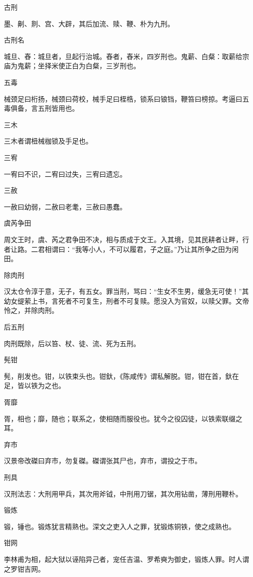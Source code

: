 \documentclass[a4paper,12pt,UTF8,twoside]{ctexbook}
\begin{document}
    古刑
    
    墨、劓、剕、宫、大辟，其后加流、赎、鞭、朴为九刑。
    
    古刑名
    
    城旦、舂：城旦者，旦起行治城。舂者，舂米，四岁刑也。鬼薪、白粲：取薪给宗庙为鬼薪；坐择米使正白为白粲，三岁刑也。
    
    五毒
    
    械颈足曰桁扬，械颈曰荷校，械手足曰桎梏，锁系曰锒铛，鞭笞曰榜掠。考逼曰五毒俱备，言五刑皆用也。
    
    三木
    
    三木者谓杻械枷锁及手足也。
    
    三宥
    
    一宥曰不识，二宥曰过失，三宥曰遗忘。
    
    三赦
    
    一赦曰幼弱，二赦曰老耄，三赦曰愚蠢。
    
    虞芮争田
    
    周文王时，虞、芮之君争田不决，相与质成于文王。入其境，见其民耕者让畔，行者让路。二君相谓曰：“我等小人，不可以履君，子之庭。”乃让其所争之田为闲田。
    
    除肉刑
    
    汉太仓令淳于意，无子，有五女。罪当刑，骂曰：“生女不生男，缓急无可使！”其幼女缇萦上书，言死者不可复生，刑者不可复赎。愿没入为官奴，以赎父罪。文帝怜之，并除肉刑。
    
    后五刑
    
    肉刑既除，后以笞、杖、徒、流、死为五刑。
    
    髡钳
    
    髡，削发也。钳，以铁束头也。钳釱，《陈咸传》谓私解脱。钳，钳在首，釱在足，皆以铁为之也。
    
    胥靡
    
    胥，相也；靡，随也；联系之，使相随而服役也。犹今之役囚徒，以铁索联缀之耳。
    
    弃市
    
    汉景帝改磔曰弃市，勿复磔。磔谓张其尸也，弃市，谓投之于市。
    
    刑具
    
    汉刑法志：大刑用甲兵，其次用斧钺，中刑用刀锯，其次用钻凿，薄刑用鞭朴。
    
    锻炼
    
    锻，锤也。锻炼犹言精熟也。深文之吏入人之罪，犹锻炼铜铁，使之成熟也。
    
    钳网
    
    李林甫为相，起大狱以诬陷异己者，宠任吉温、罗希奭为御史，锻炼人罪。时人谓之罗钳吉网。
    
\end{document}
